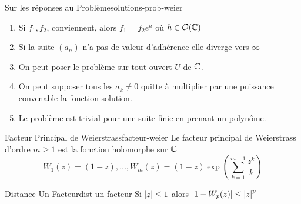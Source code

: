 \documentclass{cours}
\begin{document}
\begin{propositionfr}
	{Sur les réponses au Problème}{solutions-prob-weier}
	\begin{enumerate}
		\item Si $f_{1}, f_{2}$, conviennent, alors $f_{1} = f_{2}e^{h}$ où $h \in \mathcal{O}(\mathbb{C})$
		\item Si la suite $(a_{n})$ n'a pas de valeur d'adhérence elle diverge vers $\infty$
		\item On peut poser le problème sur tout ouvert $U$ de $\mathbb{C}$. 
		\item On peut supposer tous les $a_{k} \neq 0$ quitte à multiplier par une puissance convenable la fonction solution. 
		\item Le problème est trivial pour une suite finie en prenant un polynôme.  
	\end{enumerate}
\end{propositionfr}


\begin{définition}
	{Facteur Principal de Weierstrass}{facteur-weier}
	Le facteur principal de Weierstrass d'ordre $m \geq 1$ est la fonction holomorphe sur $\mathbb{C}$ 
	\begin{equation*}
		W_{1}(z) = (1 - z), \ldots, W_{m}(z) = (1 - z)\exp\left(\sum_{k = 1}^{m - 1}\frac{z^{k}}{k}\right)
	\end{equation*}

\end{définition}

\begin{lemme}
	{Distance Un-Facteur}{dist-un-facteur}
	Si $\left|z\right| \leq 1$ alors $\left|1 - W_{p}(z)\right| \leq \left|z\right|^{p}$
\end{lemme}
\end{document}
